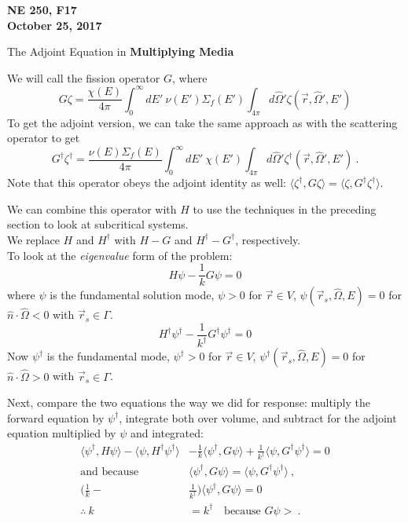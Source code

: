 \documentclass[12pt]{article}
\newcommand{\rvec}{\ensuremath{\vec{r}}}
\newcommand{\vOmega}{\ensuremath{\hat{\Omega}}}
\begin{document}
\begin{center}
{\bf NE 250, F17\\
October 25, 2017 
}
\end{center}

The Adjoint Equation in \textbf{Multiplying Media}

We will call the fission operator $G$, where
\[
G \zeta = \frac{\chi(E)}{4\pi}\int_0^{\infty} dE' \: \nu(E') \Sigma_f(E') \int_{4\pi} d\vOmega' \zeta(\rvec, \vOmega', E')
\]
To get the adjoint version, we can take the same approach as with the scattering operator to get
\[
G^{\dagger} \zeta^{\dagger} = \frac{\nu(E) \Sigma_f(E)}{4\pi}\int_0^{\infty} dE' \: \chi(E') \int_{4\pi} d\vOmega' \zeta^{\dagger}(\rvec, \vOmega', E')\:.
\]
Note that this operator obeys the adjoint identity as well: $\langle\zeta^{\dagger}, G \zeta\rangle = \langle\zeta, G^{\dagger} \zeta^{\dagger}\rangle$.

We can combine this operator with $H$ to use the techniques in the preceding section to look at subcritical systems.\\
We replace $H$ and $H^{\dagger}$ with $H-G$ and $H^{\dagger}-G^{\dagger}$, respectively.\\

To look at the \textit{eigenvalue} form of the problem:
\[
H\psi - \frac{1}{k}G\psi = 0
\]
where $\psi$ is the fundamental solution mode, $\psi > 0$ for $\rvec \in V$, $\psi(\vec{r}_s, \vOmega, E) = 0$ for $\hat{n} \cdot \vOmega < 0$ with $\vec{r}_s \in \Gamma$.  
\[
H^{\dagger}\psi^{\dagger} - \frac{1}{k^{\dagger}}G^{\dagger}\psi^{\dagger} = 0
\]
Now $\psi^{\dagger}$ is the fundamental mode, $\psi^{\dagger} > 0$ for $\rvec \in V$, $\psi^{\dagger}(\vec{r}_s, \vOmega, E) = 0$ for $\hat{n} \cdot \vOmega > 0$ with $\vec{r}_s \in \Gamma$.  

Next, compare the two equations the way we did for response: multiply the forward equation by $\psi^{\dagger}$, integrate both over volume, and subtract for the adjoint equation multiplied by $\psi$ and integrated:
\begin{align*}
\langle\psi^{\dagger}, H\psi\rangle - \langle\psi, H^{\dagger} \psi^{\dagger}\rangle &- \frac{1}{k}\langle\psi^{\dagger}, G\psi\rangle + \frac{1}{k^{\dagger}}\langle\psi, G^{\dagger}\psi^{\dagger}\rangle = 0\\
%
\text{and because }&\langle\psi^{\dagger}, G \psi\rangle = \langle\psi, G^{\dagger} \psi^{\dagger}\rangle\:,\\
%
\bigl(\frac{1}{k} -& \frac{1}{k^{\dagger}} \bigr)\langle\psi^{\dagger}, G\psi\rangle  = 0 \\
\therefore \: k &= k^{\dagger} \quad \text{because }G\psi > \:.
\end{align*}
\end{document}
